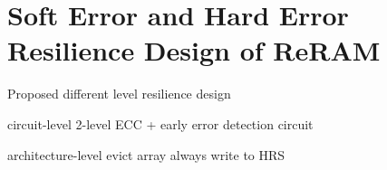\section{Soft Error and Hard Error Resilience Design of ReRAM} \label{sec:arch}


Proposed different level resilience design

circuit-level
2-level ECC + early error detection circuit

architecture-level
evict array
always write to HRS

